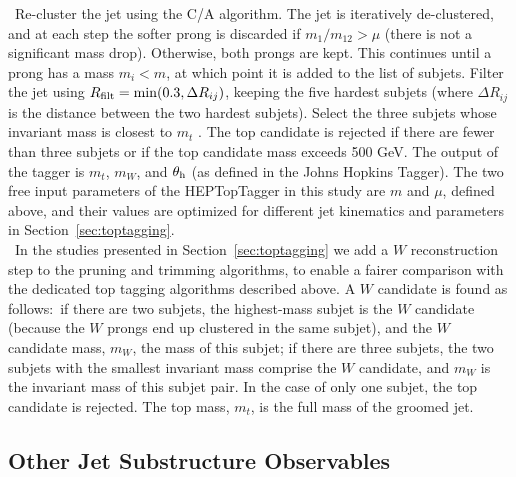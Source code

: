 ~Re-cluster the jet using the C/A algorithm. The jet is iteratively de-clustered, and at each step the softer prong is discarded if $m_1/m_{12}>\mu$ (there is not a significant mass drop). Otherwise, both prongs are kept. This continues until a prong has a mass $m_i < m$, at which point it is added to the list of subjets. Filter the jet using $R_{\rm filt}=\mathrm{min}(0.3,\Delta R_{ij})$, keeping the five hardest subjets (where $\Delta R_{ij}$ is the distance between the two hardest subjets). Select the three subjets whose invariant mass is closest to $m_t$ \cite{Plehn:2010st}. The top candidate is rejected if there are fewer than three subjets or if the top candidate mass exceeds 500 GeV. The output of the tagger is $m_t$, $m_W$, and $\theta_{\rm h}$ (as defined in the Johns Hopkins Tagger). The two free input parameters of the HEPTopTagger in this study are $m$ and $\mu$, defined above, and their values are optimized for different jet kinematics and parameters in Section~\ref{sec:toptagging}.\\

~In the studies presented in Section~\ref{sec:toptagging} we add a $W$ reconstruction step to the pruning and trimming algorithms, to enable a fairer comparison with the dedicated top tagging algorithms described above. A $W$ candidate is found as follows:~if there are two subjets, the highest-mass subjet is the $W$ candidate (because the $W$ prongs end up clustered in the same subjet), and the $W$ candidate mass, $m_W$, the mass of this subjet; if there are three subjets, the two subjets with the smallest invariant mass comprise the $W$ candidate, and $m_W$ is the invariant mass of this subjet pair. In the case of only one subjet, the top candidate is rejected. The top mass, $m_t$, is the full mass of the groomed jet.\\


\subsection{Other Jet Substructure Observables} \label{sec:substructure}

